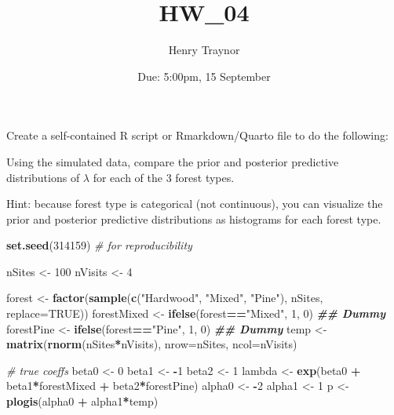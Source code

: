 \documentclass[
]{article}
\title{HW\_04}
\author{Henry Traynor}
\date{Due: 5:00pm, 15 September}
\newenvironment{Shaded}{\begin{snugshade}}{\end{snugshade}}
\newcommand{\AttributeTok}[1]{\textcolor[rgb]{0.13,0.29,0.53}{#1}}
\newcommand{\CommentTok}[1]{\textcolor[rgb]{0.56,0.35,0.01}{\textit{#1}}}
\newcommand{\ConstantTok}[1]{\textcolor[rgb]{0.56,0.35,0.01}{#1}}
\newcommand{\DecValTok}[1]{\textcolor[rgb]{0.00,0.00,0.81}{#1}}
\newcommand{\DocumentationTok}[1]{\textcolor[rgb]{0.56,0.35,0.01}{\textbf{\textit{#1}}}}
\newcommand{\FunctionTok}[1]{\textcolor[rgb]{0.13,0.29,0.53}{\textbf{#1}}}
\newcommand{\NormalTok}[1]{#1}
\newcommand{\OtherTok}[1]{\textcolor[rgb]{0.56,0.35,0.01}{#1}}
\newcommand{\SpecialCharTok}[1]{\textcolor[rgb]{0.81,0.36,0.00}{\textbf{#1}}}
\newcommand{\StringTok}[1]{\textcolor[rgb]{0.31,0.60,0.02}{#1}}
\begin{document}
\maketitle

Create a self-contained R script or Rmarkdown/Quarto file to do the
following:

Using the simulated data, compare the prior and posterior predictive
distributions of \(\lambda\) for each of the 3 forest types.

Hint: because forest type is categorical (not continuous), you can
visualize the prior and posterior predictive distributions as histograms
for each forest type.

\begin{Shaded}
\begin{Highlighting}[]
\FunctionTok{set.seed}\NormalTok{(}\DecValTok{314159}\NormalTok{) }\CommentTok{\# for reproducibility}

\NormalTok{nSites }\OtherTok{\textless{}{-}} \DecValTok{100}
\NormalTok{nVisits }\OtherTok{\textless{}{-}} \DecValTok{4}

\NormalTok{forest }\OtherTok{\textless{}{-}} \FunctionTok{factor}\NormalTok{(}\FunctionTok{sample}\NormalTok{(}\FunctionTok{c}\NormalTok{(}\StringTok{"Hardwood"}\NormalTok{, }\StringTok{"Mixed"}\NormalTok{, }\StringTok{"Pine"}\NormalTok{), nSites, }\AttributeTok{replace=}\ConstantTok{TRUE}\NormalTok{))}
\NormalTok{forestMixed }\OtherTok{\textless{}{-}} \FunctionTok{ifelse}\NormalTok{(forest}\SpecialCharTok{==}\StringTok{"Mixed"}\NormalTok{, }\DecValTok{1}\NormalTok{, }\DecValTok{0}\NormalTok{)        }\DocumentationTok{\#\# Dummy}
\NormalTok{forestPine }\OtherTok{\textless{}{-}} \FunctionTok{ifelse}\NormalTok{(forest}\SpecialCharTok{==}\StringTok{"Pine"}\NormalTok{, }\DecValTok{1}\NormalTok{, }\DecValTok{0}\NormalTok{)          }\DocumentationTok{\#\# Dummy}
\NormalTok{temp }\OtherTok{\textless{}{-}} \FunctionTok{matrix}\NormalTok{(}\FunctionTok{rnorm}\NormalTok{(nSites}\SpecialCharTok{*}\NormalTok{nVisits), }\AttributeTok{nrow=}\NormalTok{nSites, }\AttributeTok{ncol=}\NormalTok{nVisits)}

\CommentTok{\# true coeffs}
\NormalTok{beta0 }\OtherTok{\textless{}{-}} \DecValTok{0}
\NormalTok{beta1 }\OtherTok{\textless{}{-}} \SpecialCharTok{{-}}\DecValTok{1}
\NormalTok{beta2 }\OtherTok{\textless{}{-}} \DecValTok{1}
\NormalTok{lambda }\OtherTok{\textless{}{-}} \FunctionTok{exp}\NormalTok{(beta0 }\SpecialCharTok{+}\NormalTok{ beta1}\SpecialCharTok{*}\NormalTok{forestMixed }\SpecialCharTok{+}\NormalTok{ beta2}\SpecialCharTok{*}\NormalTok{forestPine)}
\NormalTok{alpha0 }\OtherTok{\textless{}{-}} \SpecialCharTok{{-}}\DecValTok{2}
\NormalTok{alpha1 }\OtherTok{\textless{}{-}} \DecValTok{1}
\NormalTok{p }\OtherTok{\textless{}{-}} \FunctionTok{plogis}\NormalTok{(alpha0 }\SpecialCharTok{+}\NormalTok{ alpha1}\SpecialCharTok{*}\NormalTok{temp)}


\end{Highlighting}
\end{Shaded}
\end{document}
